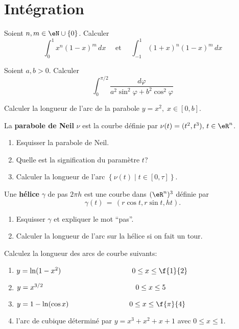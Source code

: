 



\section{Intégration}

\exerNico 
Soient $n,m \in \eN \cup \{0\}$.
Calculer
$$
\int_0^1 x^n (1-x)^m \,dx
\quad \text{ et } \quad
\int_{-1}^1 (1+x)^n (1-x)^m \,dx
$$



\exerNico 
Soient $a,b >0$. 
Calculer
$$
\int_0^{\pi /2} \displaystyle \frac{d \varphi}{a^2 \sin^2 \varphi + b^2 \cos^2 \varphi}
$$


\exerNico  
Calculer la longueur de l'arc de la parabole $y = x^2,\;x \in [0,b]$.

\exerNico  
La {\bf parabole de Neil} $\nu$ est la courbe définie par
$\nu (t) = (t^2,t^3), \, t \in \eR^n$.
\begin{enumerate}
\item Esquisser la parabole de Neil.

\item Quelle est la signification du paramètre $t$?

\item Calculer la longueur de l'arc 
$\left\{ \nu (t) \mid t \in [0,\tau] \right\}$.
\end{enumerate}

\exerNico  
Une {\bf hélice} $\gamma$ de pas $2 \pi h$ est une courbe dans $(\eR^n)^3$ définie par
$$
\gamma (t) \,=\, \left( r \cos t , r \sin t , h t \right)  .
$$

\begin{enumerate}
\item Esquisser $\gamma$ et expliquer le mot ``pas''.

\item Calculer la longueur de l'arc sur la hélice si on fait un tour.
\end{enumerate}

\exerNico Calculez la longueur des arcs de courbe suivants:
\begin{enumerate}
\item $y= \ln(1-x^2)  \hspace{3.5cm} 0\leq x\leq \f{1}{2}$
\item  $y= x^{3/2}  \hspace{4.57cm} 0\leq x\leq 5$
\item $y = 1-\ln(\cos x) \hspace{3cm} 0\leq x \leq \f{\pi}{4}$
\item l'arc de cubique déterminé par $y=x^3+x^2+x+1$ avec $0\leq x \leq 1$.
\end{enumerate}

